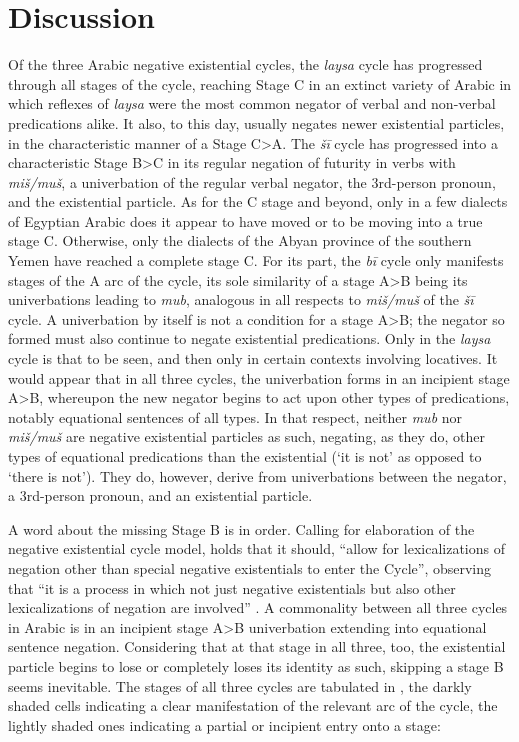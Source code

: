 \documentclass[output=paper,colorlinks,citecolor=brown]{langscibook}
\begin{document}
\section{Discussion} \label{s:WiAR-5}

Of the three Arabic negative existential cycles, the \textit{laysa} cycle has progressed through all stages of the cycle, reaching Stage C in an extinct variety of Arabic in which reflexes of \textit{laysa} were the most common negator of verbal and non-verbal predications alike. It also, to this day, usually negates newer existential particles, in the characteristic manner of a Stage C>A. The \textit{šī} cycle has progressed into a characteristic Stage B>C in its regular negation of futurity in verbs with \textit{miš/muš}, a univerbation of the regular verbal negator, the 3rd-person pronoun, and the existential particle. As for the C stage and beyond, only in a few dialects of Egyptian Arabic does it appear to have moved or to be moving into a true stage C. Otherwise, only the dialects of the Abyan province of the southern Yemen have reached a complete stage C. For its part, the \textit{bī} cycle only manifests stages of the A arc of the cycle, its sole similarity of a stage A>B being its univerbations leading to \textit{mub}, analogous in all respects to \textit{miš/muš} of the \textit{šī} cycle. A univerbation by itself is not a condition for a stage A>B; the negator so formed must also continue to negate existential predications. Only in the \textit{laysa} cycle is that to be seen, and then only in certain contexts involving locatives. It would appear that in all three cycles, the univerbation forms in an incipient stage A>B, whereupon the new negator begins to act upon other types of predications, notably equational sentences of all types. In that respect, neither \textit{mub} nor \textit{miš/muš} are negative existential particles as such, negating, as they do, other types of equational predications than the existential (‘it is not’ as opposed to ‘there is not’). They do, however, derive from univerbations between the negator, a 3rd-person pronoun, and an existential particle.

A word about the missing Stage B is in order. Calling for elaboration of the negative existential cycle model, \citet{Veselinova2014} holds that it should, “allow for lexicalizations of negation other than special negative existentials to enter the Cycle”, observing that “it is a process in which not just negative existentials but also other lexicalizations of negation are involved” \citeyearpar[1338, 1139]{Veselinova2014}. A commonality between all three cycles in Arabic is in an incipient stage A>B univerbation extending into equational sentence negation. Considering that at that stage in all three, too, the existential particle begins to lose or completely loses its identity as such, skipping a stage B seems inevitable. The stages of all three cycles are tabulated in , the darkly shaded cells indicating a clear manifestation of the relevant arc of the cycle, the lightly shaded ones indicating a partial or incipient entry onto a stage:
\end{document}

